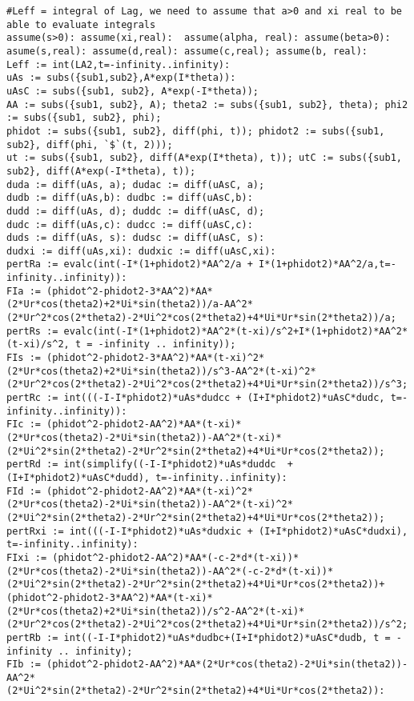 \begin{lstlisting}
#Leff = integral of Lag, we need to assume that a>0 and xi real to be able to evaluate integrals
assume(s>0): assume(xi,real):  assume(alpha, real): assume(beta>0): asume(s,real): assume(d,real): assume(c,real); assume(b, real):
Leff := int(LA2,t=-infinity..infinity):
uAs := subs({sub1,sub2},A*exp(I*theta)):    
uAsC := subs({sub1, sub2}, A*exp(-I*theta));
AA := subs({sub1, sub2}, A); theta2 := subs({sub1, sub2}, theta); phi2 := subs({sub1, sub2}, phi);
phidot := subs({sub1, sub2}, diff(phi, t)); phidot2 := subs({sub1, sub2}, diff(phi, `$`(t, 2)));
ut := subs({sub1, sub2}, diff(A*exp(I*theta), t)); utC := subs({sub1, sub2}, diff(A*exp(-I*theta), t));
duda := diff(uAs, a); dudac := diff(uAsC, a);
dudb := diff(uAs,b): dudbc := diff(uAsC,b):
dudd := diff(uAs, d); duddc := diff(uAsC, d);
dudc := diff(uAs,c): dudcc := diff(uAsC,c):
duds := diff(uAs, s): dudsc := diff(uAsC, s):
dudxi := diff(uAs,xi): dudxic := diff(uAsC,xi):  
pertRa := evalc(int(-I*(1+phidot2)*AA^2/a + I*(1+phidot2)*AA^2/a,t=-infinity..infinity)):
FIa := (phidot^2-phidot2-3*AA^2)*AA*(2*Ur*cos(theta2)+2*Ui*sin(theta2))/a-AA^2*(2*Ur^2*cos(2*theta2)-2*Ui^2*cos(2*theta2)+4*Ui*Ur*sin(2*theta2))/a;
pertRs := evalc(int(-I*(1+phidot2)*AA^2*(t-xi)/s^2+I*(1+phidot2)*AA^2*(t-xi)/s^2, t = -infinity .. infinity));
FIs := (phidot^2-phidot2-3*AA^2)*AA*(t-xi)^2*(2*Ur*cos(theta2)+2*Ui*sin(theta2))/s^3-AA^2*(t-xi)^2*(2*Ur^2*cos(2*theta2)-2*Ui^2*cos(2*theta2)+4*Ui*Ur*sin(2*theta2))/s^3;
pertRc := int(((-I-I*phidot2)*uAs*dudcc + (I+I*phidot2)*uAsC*dudc, t=-infinity..infinity)): 
FIc := (phidot^2-phidot2-AA^2)*AA*(t-xi)*(2*Ur*cos(theta2)-2*Ui*sin(theta2))-AA^2*(t-xi)*(2*Ui^2*sin(2*theta2)-2*Ur^2*sin(2*theta2)+4*Ui*Ur*cos(2*theta2));
pertRd := int(simplify((-I-I*phidot2)*uAs*duddc  + (I+I*phidot2)*uAsC*dudd), t=-infinity..infinity):
FId := (phidot^2-phidot2-AA^2)*AA*(t-xi)^2*(2*Ur*cos(theta2)-2*Ui*sin(theta2))-AA^2*(t-xi)^2*(2*Ui^2*sin(2*theta2)-2*Ur^2*sin(2*theta2)+4*Ui*Ur*cos(2*theta2));
pertRxi := int(((-I-I*phidot2)*uAs*dudxic + (I+I*phidot2)*uAsC*dudxi), t=-infinity..infinity): 
FIxi := (phidot^2-phidot2-AA^2)*AA*(-c-2*d*(t-xi))*(2*Ur*cos(theta2)-2*Ui*sin(theta2))-AA^2*(-c-2*d*(t-xi))*(2*Ui^2*sin(2*theta2)-2*Ur^2*sin(2*theta2)+4*Ui*Ur*cos(2*theta2))+(phidot^2-phidot2-3*AA^2)*AA*(t-xi)*(2*Ur*cos(theta2)+2*Ui*sin(theta2))/s^2-AA^2*(t-xi)*(2*Ur^2*cos(2*theta2)-2*Ui^2*cos(2*theta2)+4*Ui*Ur*sin(2*theta2))/s^2;
pertRb := int((-I-I*phidot2)*uAs*dudbc+(I+I*phidot2)*uAsC*dudb, t = -infinity .. infinity);
FIb := (phidot^2-phidot2-AA^2)*AA*(2*Ur*cos(theta2)-2*Ui*sin(theta2))-AA^2*(2*Ui^2*sin(2*theta2)-2*Ur^2*sin(2*theta2)+4*Ui*Ur*cos(2*theta2)):


\end{lstlisting}
